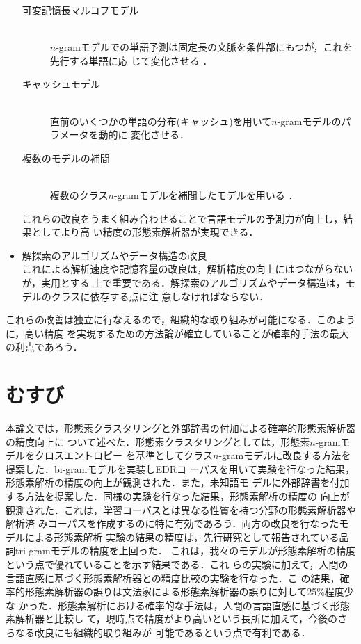 \begin{itemize}
  \begin{description}
  \item[可変記憶長マルコフモデル] \ \\
    $n$-gramモデルでの単語予測は固定長の文脈を条件部にもつが，これを先行する単語に応
    じて変化させる\cite{Part.of.Speech.Tagging.Using.a.Variable.Memory.Markov.Model}
    \cite{文脈木を利用した形態素解析}．
  \item[キャッシュモデル] \ \\
    直前のいくつかの単語の分布(キャッシュ)を用いて$n$-gramモデルのパラメータを動的に
    変化させる\cite{A.Cache-Based.Natural.Language.Model.for.Speech.Recognition}．
  \item[複数のモデルの補間] \ \\
    複数のクラス$n$-gramモデルを補間したモデルを用いる
    \cite{Improving.Statistical.Language.Model.Performance.with.Automatically.Generated.Word.Hierarchies}
    ．
  \end{description}
  これらの改良をうまく組み合わせることで言語モデルの予測力が向上し，結果としてより高
  い精度の形態素解析器が実現できる．
\item 解探索のアルゴリズムやデータ構造の改良 \\
  これによる解析速度や記憶容量の改良は，解析精度の向上にはつながらないが，実用とする
  上で重要である．解探索のアルゴリズムやデータ構造は，モデルのクラスに依存する点に注
  意しなければならない．
\end{itemize}
これらの改善は独立に行なえるので，組織的な取り組みが可能になる．このように，高い精度
を実現するための方法論が確立していることが確率的手法の最大の利点であろう．







\section{むすび}

本論文では，形態素クラスタリングと外部辞書の付加による確率的形態素解析器の精度向上に
ついて述べた．形態素クラスタリングとしては，形態素$n$-gramモデルをクロスエントロピー
を基準としてクラス$n$-gramモデルに改良する方法を提案した．bi-gramモデルを実装しEDRコ
ーパスを用いて実験を行なった結果，形態素解析の精度の向上が観測された．また，未知語モ
デルに外部辞書を付加する方法を提案した．同様の実験を行なった結果，形態素解析の精度の
向上が観測された．これは，学習コーパスとは異なる性質を持つ分野の形態素解析器や解析済
みコーパスを作成するのに特に有効であろう．両方の改良を行なったモデルによる形態素解析
実験の結果の精度は，先行研究として報告されている品詞tri-gramモデルの精度を上回った．
これは，我々のモデルが形態素解析の精度という点で優れていることを示す結果である．これ
らの実験に加えて，人間の言語直感に基づく形態素解析器との精度比較の実験を行なった．こ
の結果，確率的形態素解析器の誤りは文法家による形態素解析器の誤りに対して25\%程度少な
かった．形態素解析における確率的な手法は，人間の言語直感に基づく形態素解析器と比較し
て，現時点で精度がより高いという長所に加えて，今後のさらなる改良にも組織的取り組みが
可能であるという点で有利である．







